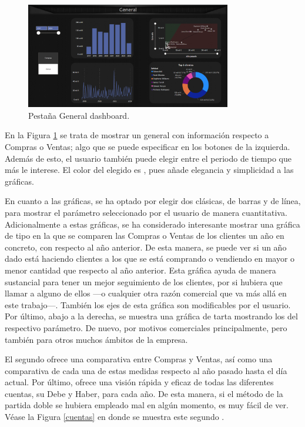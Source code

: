 \begin{figure}[H]
	\centering
	\includegraphics[width= 0.8\textwidth]{imgs/general_dashboard}
	\caption{Pestaña General dashboard.}
	\label{general}
\end{figure}

En la Figura \ref{general} se trata de mostrar un  general con información respecto a Compras o Ventas;  algo que se puede especificar en los botones de la izquierda. Además de esto, el usuario también puede elegir entre el periodo de tiempo que más le interese. El color del  elegido es , pues añade elegancia y simplicidad a las gráficas.

En cuanto a las gráficas, se ha optado por elegir dos clásicas, de barras y de línea, para mostrar el parámetro seleccionado por el usuario de manera cuantitativa. Adicionalmente a estas gráficas, se ha considerado interesante mostrar una gráfica de tipo  en la que se comparen las Compras o Ventas de los clientes un año en concreto, con respecto al año anterior. De esta manera, se puede ver si un año dado está haciendo clientes a los que se está comprando o vendiendo en mayor o menor cantidad que respecto al año anterior. Esta gráfica ayuda de manera sustancial para tener un mejor seguimiento de los clientes, por si hubiera que llamar a alguno de ellos ---o cualquier otra razón comercial que va más allá en este trabajo---. También los ejes de esta gráfica son modificables por el usuario. Por último, abajo a la derecha, se muestra una gráfica de tarta mostrando los  del respectivo parámetro. De nuevo, por motivos comerciales principalmente, pero también para otros muchos ámbitos de la empresa.


El segundo  ofrece una comparativa entre Compras y Ventas, así como una comparativa de cada una de estas medidas respecto al año pasado hasta el día actual. Por último, ofrece una visión rápida y eficaz de todas las diferentes cuentas, su Debe y Haber, para cada año. De esta manera, si el método de la partida doble se hubiera empleado mal en algún momento, es muy fácil de ver. Véase la Figura \ref{cuentas} en donde se muestra este segundo .


